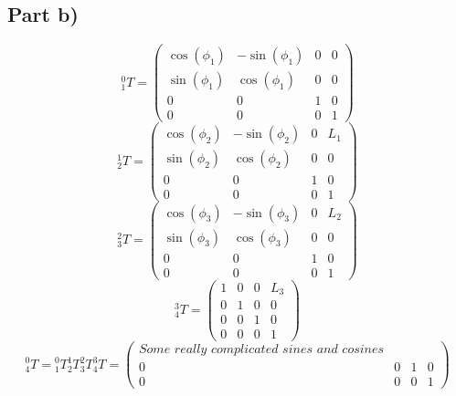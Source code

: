 \documentclass[10pt,a4paper]{article}
\begin{document}
\subsection*{Part b)}

\begin{equation*}
  {}_{1}^{0}T = \begin{pmatrix}
    \cos(\phi_{1}) & -\sin(\phi_{1}) & 0 & 0\\
    \sin(\phi_{1}) & \cos(\phi_{1}) & 0 & 0\\
    0 & 0 & 1 & 0\\
    0 & 0 & 0 & 1
  \end{pmatrix}
\end{equation*}
\begin{equation*}
  {}_{2}^{1}T = \begin{pmatrix}
    \cos(\phi_{2}) & -\sin(\phi_{2}) & 0 & L_{1}\\
    \sin(\phi_{2}) & \cos(\phi_{2}) & 0 & 0\\
    0 & 0 & 1 & 0\\
    0 & 0 & 0 & 1
  \end{pmatrix}
\end{equation*}
\begin{equation*}
  {}_{3}^{2}T = \begin{pmatrix}
    \cos(\phi_{3}) & -\sin(\phi_{3}) & 0 & L_{2}\\
    \sin(\phi_{3}) & \cos(\phi_{3}) & 0 & 0\\
    0 & 0 & 1 & 0\\
    0 & 0 & 0 & 1
  \end{pmatrix}
\end{equation*}
\begin{equation*}
  {}_{4}^{3}T = \begin{pmatrix}
    1 & 0 & 0 & L_{3}\\
    0 & 1 & 0 & 0\\
    0 & 0 & 1 & 0\\
    0 & 0 & 0 & 1
  \end{pmatrix}
\end{equation*}
\begin{equation*}
  {}_{4}^{0}T = {}_{1}^{0}T{}_{2}^{1}T{}_{3}^{2}T{}_{4}^{3}T = \begin{pmatrix}
    \textit{Some really complicated sines and cosines} &&&\\
    0 & 0 & 1 & 0\\
    0 & 0 & 0 & 1
  \end{pmatrix}
\end{equation*}
\end{document}
